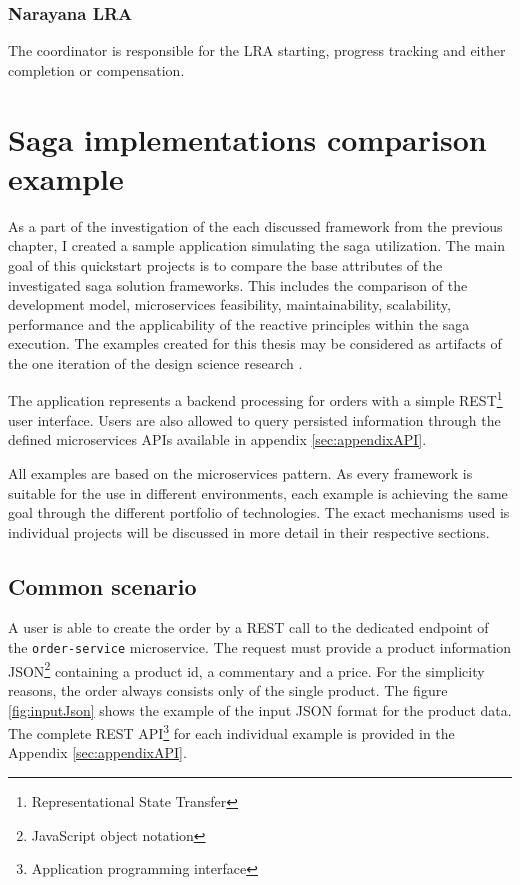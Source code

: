 \documentclass[oneside,
  digital, %
  table,   %
  nolof,     %
  nolot,     %
]{fithesis3}
\begin{document}
\subsection{Narayana LRA}

The coordinator is responsible for the LRA starting, progress tracking and either completion or compensation. 

 


\clearpage
\chapter{Saga implementations comparison example}

As a part of the investigation of the each discussed framework from the previous chapter, I created a sample application simulating the saga utilization. The main goal of this quickstart projects is to compare the base attributes of the investigated saga solution frameworks. This includes the comparison of the development model, microservices feasibility, maintainability, scalability, performance and the applicability of the reactive principles within the saga execution. The examples created for this thesis may be considered as artifacts of the one iteration of the design science research \cite{design_science}.

The application represents a backend processing for orders with a simple REST\footnote{Representational State Transfer} user interface. Users are also allowed to query persisted information through the defined microservices APIs available in appendix \ref{sec:appendixAPI}.

All examples are based on the microservices pattern. As every framework is suitable for the use in different environments, each example is achieving the same goal through the different portfolio of technologies. The exact mechanisms used is individual projects will be discussed in more detail in their respective sections.

\section{Common scenario}

A user is able to create the order by a REST call to the dedicated endpoint of the \texttt{order-service} microservice. The request must provide a product information JSON\footnote{JavaScript object notation} containing a product id, a commentary and a price. For the simplicity reasons, the order always consists only of the single product. The figure \ref{fig:inputJson} shows the example of the input JSON format for the product data. The complete REST API\footnote{Application programming interface} for each individual example is provided in the Appendix \ref{sec:appendixAPI}.
\end{document}
